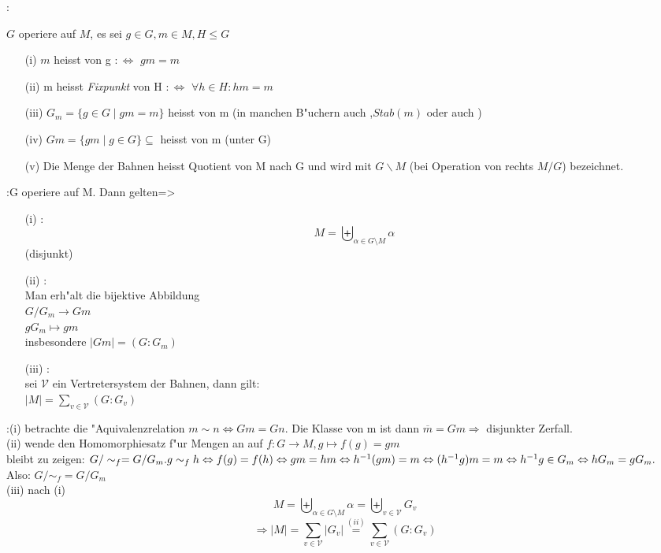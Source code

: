:{
  $G$ operiere auf $M$, es sei $g \in G, m \in M, H \leq G$
  \begin{enumerate}
  \item[(i)] $m$ heisst \emph{} von g $:\iff$ $gm = m $
  \item[(ii)] m heisst \emph{\indexthis Fixpunkt} von H $:\iff $ $\forall h \in H: hm = m$
  \item[(iii)] $G_m = \{g \in G \mid gm = m \}$ heisst {\emph {}} von m
       (in manchen B"uchern auch \emph{},$Stab(m)$ oder auch
		)
  \item[(iv)] $Gm = \{ gm \mid g \in G\} \subseteq $ heisst {\emph {}} von m (unter G)
  \item[(v)] Die Menge der { Bahnen} heisst Quotient von M nach G und wird mit $G \backslash M$ 
	         (bei Operation von rechts $M/G$) bezeichnet.
  \end{enumerate}}

\theorem{}:{G operiere auf M. Dann gelten}=>
  { \begin{enumerate}
     \item[(i)] {\emph {}}: \[ M = { \biguplus_{\alpha \in G \setminus M}} \alpha \]  (disjunkt)  		 
	 \item[(ii)] {\emph {}}:\\
     Man erh"alt die bijektive Abbildung \\
     $ G/G_m \longrightarrow Gm$ \\
     $g G_m \mapsto gm $\\
	 insbesondere $ |Gm| = (G:G_m) $       
     \item[(iii)] {\emph {}}: \\
	 sei $ \mathcal{V}$ ein Vertretersystem der Bahnen, dann gilt:\\
	 $|M| = \sum_{v \in \mathcal{V}} (G:G_v)$
	\end{enumerate}} 
\proof{}:{(i) betrachte die "Aquivalenzrelation $ m \sim n \Leftrightarrow Gm = Gn $. Die Klasse von m ist dann
  $\overline{m} = Gm \Rightarrow $ disjunkter Zerfall.\\
  (ii) wende den Homomorphiesatz f"ur Mengen an auf $f: G \longrightarrow M, g \mapsto f(g)=gm $ \\
 bleibt zu zeigen: $ G/\sim_f = G/G_m. \\
 g \sim_f h \Leftrightarrow f(g) = f(h)
 \Leftrightarrow gm = hm \Leftrightarrow h^{-1}(gm) = m \Leftrightarrow (h^{-1}g)m = m 
 \Leftrightarrow h^{-1}g \in G_m \Leftrightarrow hG_m =gG_m.$ Also: ${G/\sim_f} = G/G_m $ \\
 (iii) nach (i) \[ M = \biguplus_{\alpha \in G\setminus M} \alpha = \biguplus_{v \in \mathcal{V}}G_v \]
 \[\Rightarrow  |M| = \sum_{v\in\mathcal{V}}|G_v| \stackrel{(ii)}{=} \sum_{v\in\mathcal{V}}(G:G_v) \] 
		   }

